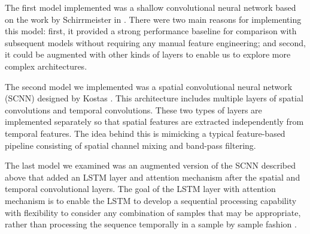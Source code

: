 \documentclass[10pt,twocolumn,letterpaper]{article}
\begin{document}
The first model implemented was a shallow convolutional neural network
based on the work by Schirrmeister \etal in \cite{DBLP}. There were two main
reasons for implementing this model: first, it provided a strong performance
baseline for comparison with subsequent models without requiring any manual
feature engineering; and second, it could be augmented with other kinds of
layers to enable us to explore more complex architectures.


The second model we implemented was a spatial convolutional neural network
(SCNN) designed by Kostas \etal \cite{kostas2019machine}. This architecture
includes multiple layers of spatial convolutions and temporal convolutions.
These two types of layers are implemented separately so that spatial features
are extracted independently from temporal features. The idea behind this is
mimicking a typical feature-based pipeline consisting of spatial channel mixing
and band-pass filtering.

The last model we examined was an augmented version of the SCNN described above
that added an LSTM layer and attention mechanism after the spatial and temporal
convolutional layers. The goal of the LSTM layer with attention mechanism is to
enable the LSTM to develop a sequential processing capability with flexibility
to consider any combination of samples that may be appropriate, rather than
processing the sequence temporally in a sample by sample fashion
\cite{kostas2019machine}.


\end{document}

